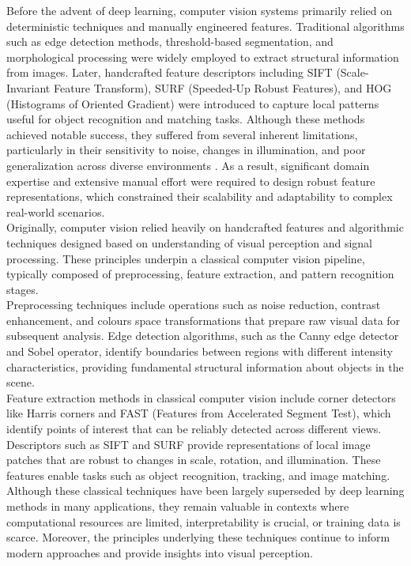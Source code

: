 \documentclass[12pt,a4paper]{report}
\begin{document}
Before the advent of deep learning, computer vision systems primarily relied on deterministic techniques and manually engineered features. Traditional algorithms such as edge detection methods, threshold-based segmentation, and morphological processing were widely employed to extract structural information from images.
Later, handcrafted feature descriptors including SIFT \cite{chiave50} (Scale-Invariant Feature Transform), SURF \cite{chiave51} (Speeded-Up Robust Features), and HOG \cite{chiave52} (Histograms of Oriented Gradient) were introduced to capture local patterns useful for object recognition and matching tasks. Although these methods achieved notable success, they suffered from several inherent limitations, particularly in their sensitivity to noise, changes in illumination, and poor generalization across diverse environments \cite{chiave50}. As a result, significant domain expertise and extensive manual effort were required to design robust feature representations, which constrained their scalability and adaptability to complex real-world scenarios.
\\
Originally, computer vision relied heavily on handcrafted features and algorithmic techniques designed based on understanding of visual perception and signal processing. These principles underpin a classical computer vision pipeline, typically composed of preprocessing, feature extraction, and pattern recognition stages.
\\Preprocessing techniques include operations such as noise reduction, contrast enhancement, and colours space transformations that prepare raw visual data for subsequent analysis. Edge detection algorithms, such as the Canny edge detector and Sobel operator, identify boundaries between regions with different intensity characteristics, providing fundamental structural information about objects in the scene.
\\Feature extraction methods in classical computer vision include corner detectors like Harris corners \cite{chiave53} and FAST \cite{chiave54} (Features from Accelerated Segment Test), which identify points of interest that can be reliably detected across different views. Descriptors such as SIFT and SURF provide representations of local image patches that are robust to changes in scale, rotation, and illumination. These features enable tasks such as object recognition, tracking, and image matching.
Although these classical techniques have been largely superseded by deep learning methods in many applications, they remain valuable in contexts where computational resources are limited, interpretability is crucial, or training data is scarce. Moreover, the principles underlying these techniques continue to inform modern approaches and provide insights into visual perception.
\end{document}

